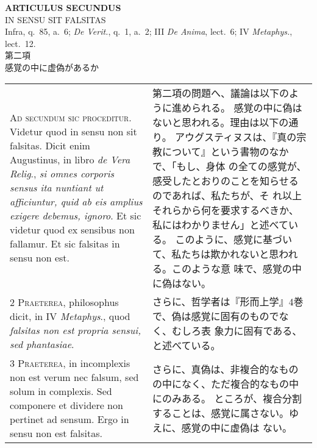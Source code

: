 \documentclass[paper=a4paper,fontsize=10pt,jafontsize=9pt,titlepage]{jlreq}
\begin{document}
\newpage

\begin{center}
 {\Large {\bfseries ARTICULUS SECUNDUS}}\\
 {\large IN SENSU SIT FALSITAS}\\
 {\footnotesize Infra, q.~85, a.~6; {\itshape De Verit.}, q.~1, a.~2;
 III {\itshape De Anima}, lect.~6; IV {\itshape Metaphys.}, lect.~12.}\\
 {\Large 第二項\\感覚の中に虚偽があるか}
\end{center}

\begin{longtable}{p{21em}p{21em}}

{\huge A}{\scshape d secundum sic proceditur}. Videtur quod in sensu
non sit falsitas. Dicit enim Augustinus, in libro {\itshape de Vera Relig}., {\itshape si
omnes corporis sensus ita nuntiant ut afficiuntur, quid ab eis amplius
exigere debemus, ignoro}. Et sic videtur quod ex sensibus non
fallamur. Et sic falsitas in sensu non est.


&


第二項の問題へ、議論は以下のように進められる。
感覚の中に偽はないと思われる。理由は以下の通り。
アウグスティヌスは、『真の宗教について』という書物のなかで、「もし、身体
 の全ての感覚が、感受したとおりのことを知らせるのであれば、私たちが、そ
 れ以上それらから何を要求するべきか、私にはわかりません」と述べている。
 このように、感覚に基づいて、私たちは欺かれないと思われる。このような意
 味で、感覚の中に偽はない。 

\\


{\scshape 2 Praeterea}, philosophus dicit, in IV {\itshape Metaphys}., quod
{\itshape falsitas non est propria sensui, sed phantasiae}.


&
さらに、哲学者は『形而上学』4巻で、偽は感覚に固有のものでなく、むしろ表
 象力に固有である、と述べている。

\\


{\scshape 3 Praeterea}, in incomplexis non est verum nec falsum, sed
solum in complexis. Sed componere et dividere non pertinet ad
sensum. Ergo in sensu non est falsitas.


&

さらに、真偽は、非複合的なものの中になく、ただ複合的なもの中にのみある。
 ところが、複合分割することは、感覚に属さない。ゆえに、感覚の中に虚偽は
 ない。

\\



\end{longtable}
\end{document}

